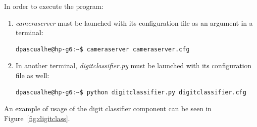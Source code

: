In order to execute the program:
\begin{enumerate}
	\item \textit{cameraserver} must be launched with its configuration file as an argument in a terminal:
	\begin{Verbatim}[frame=single]
dpascualhe@hp-g6:~$ cameraserver cameraserver.cfg
	\end{Verbatim}
	
	\item In another terminal, \textit{digitclassifier.py} must be launched with its configuration file as well:
	\begin{Verbatim}[frame=single]
dpascualhe@hp-g6:~$ python digitclassifier.py digitclassifier.cfg
	\end{Verbatim}
\end{enumerate}

An example of usage of the digit classifier component can be seen in Figure~\ref{fig:digitclass}.

